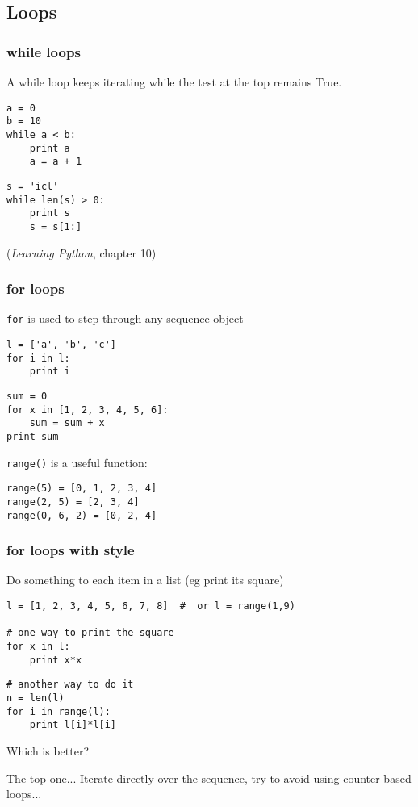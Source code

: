 \subsection{Loops}

\begin{frame}[fragile]
  \frametitle{while loops}

  A while loop keeps iterating while the test at the top remains True.

{\small
\begin{verbatim}
a = 0
b = 10
while a < b:
    print a
    a = a + 1
\end{verbatim}
  \pause
\begin{verbatim}
s = 'icl'
while len(s) > 0:
    print s
    s = s[1:]
\end{verbatim}}
    (\emph{Learning Python}, chapter 10)    
\end{frame}

\begin{frame}[fragile]
  \frametitle{for loops}

  \texttt{for} is used to step through any sequence object
{\small
\begin{verbatim}
l = ['a', 'b', 'c']
for i in l:
    print i
\end{verbatim}}
  \pause
{\small
\begin{verbatim}
sum = 0
for x in [1, 2, 3, 4, 5, 6]:
    sum = sum + x
print sum
\end{verbatim}}
  \pause
\texttt{range()} is a useful function:
{\small
\begin{verbatim}
range(5) = [0, 1, 2, 3, 4]
range(2, 5) = [2, 3, 4]
range(0, 6, 2) = [0, 2, 4]
\end{verbatim}}
\end{frame}

\begin{frame}[fragile]
  \frametitle{for loops with style}

  Do something to each item in a list (eg print its square)

\begin{verbatim}
l = [1, 2, 3, 4, 5, 6, 7, 8]  #  or l = range(1,9)

# one way to print the square
for x in l:
    print x*x
\end{verbatim}
  \pause
\begin{verbatim}
# another way to do it
n = len(l)
for i in range(l):
    print l[i]*l[i]
\end{verbatim}
  \pause

  Which is better?

  \pause
  The top one...  Iterate directly over the sequence, try to avoid
  using counter-based loops...  
\end{frame}

